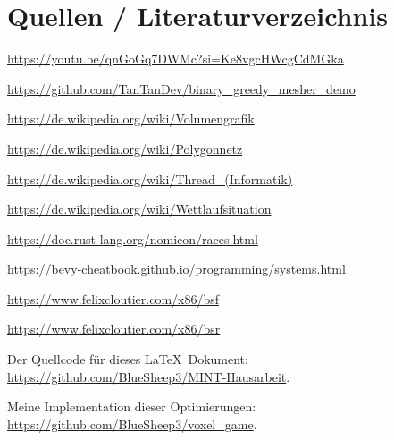 \section{Quellen / Literaturverzeichnis}


\renewcommand{\section}[2]{}

\begin{thebibliography}{9}

\setlength{\itemindent}{0.5cm}

\url{https://youtu.be/qnGoGq7DWMc?si=Ke8vgcHWcgCdMGka}

\url{https://github.com/TanTanDev/binary_greedy_mesher_demo}

\url{https://de.wikipedia.org/wiki/Volumengrafik}

\url{https://de.wikipedia.org/wiki/Polygonnetz}

\url{https://de.wikipedia.org/wiki/Thread_(Informatik)}

\url{https://de.wikipedia.org/wiki/Wettlaufsituation}

\url{https://doc.rust-lang.org/nomicon/races.html}

\url{https://bevy-cheatbook.github.io/programming/systems.html}

\url{https://www.felixcloutier.com/x86/bsf}

\url{https://www.felixcloutier.com/x86/bsr}

\end{thebibliography}


\vspace{0.2cm}

\setlength{\parindent}{0pt}

Der Quellcode für dieses \LaTeX\ Dokument: \\
\url{https://github.com/BlueSheep3/MINT-Hausarbeit}.

\vspace{0.2cm}

Meine Implementation dieser Optimierungen: \\
\url{https://github.com/BlueSheep3/voxel_game}.
